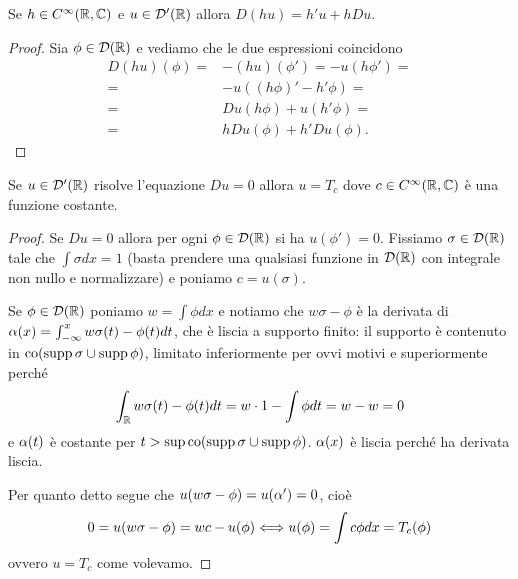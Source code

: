 \documentclass[a4paper]{article}
\DeclareMathOperator{\co}{co}
\begin{document}

\begin{lemma}\label{LmLeibnitzDistribuzioni}
Se $h\in C^{\infty}(\mathbb{R},\mathbb{C})$ e $u\in \mathcal{D}'(\mathbb{R})$ allora $D(hu)=h'u+hDu$.
\end{lemma}
\begin{proof}
Sia $\phi\in \mathcal{D}(\mathbb{R})$ e vediamo che le due espressioni coincidono
\begin{align*}
D(hu)(\phi)=&-(hu)(\phi')=-u(h\phi')=\\
=&-u((h\phi)'-h'\phi)=\\
=&Du(h\phi)+u(h'\phi)=\\
=&hDu(\phi)+h'Du(\phi).
\end{align*}
\end{proof}

\begin{lemma}\label{LmDerivataNullaImplicaDistribuzioneCostante}
Se $u\in \mathcal{D}'(\mathbb{R})$ risolve l'equazione $Du=0$ allora $u=T_c$ dove $c\in C^\infty(\mathbb{R},\mathbb{C})$ \`e una funzione costante.
\end{lemma}
\begin{proof}
Se $Du=0$ allora per ogni $\phi\in \mathcal{D}(\mathbb{R})$ si ha $u(\phi')=0$. Fissiamo $\sigma\in \mathcal{D}(\mathbb{R})$ tale che $\int \sigma dx=1$ (basta prendere una qualsiasi funzione in $\mathcal{D}(\mathbb{R})$ con integrale non nullo e normalizzare) e poniamo $c=u(\sigma)$. 

Se $\phi\in \mathcal{D}(\mathbb{R})$ poniamo $w=\int \phi dx$ e notiamo che $w\sigma-\phi$ \`e la derivata di $\alpha(x)=\int_{-\infty}^x w\sigma(t)-\phi(t)dt$, che \`e liscia a supporto finito:
il supporto \`e contenuto in $\co(\supp \sigma\cup \supp \phi)$, limitato inferiormente per ovvi motivi e superiormente perch\'e 
\[\int_{\mathbb{R}} w\sigma(t)-\phi(t)dt=w\cdot 1-\int \phi dt=w-w=0\] 
e $\alpha(t)$ \`e costante per $t>\sup \co(\supp \sigma\cup \supp \phi)$. $\alpha(x)$ \`e liscia perch\'e ha derivata liscia.

Per quanto detto segue che $u(w\sigma-\phi)=u(\alpha')=0$, cio\`e
\[0=u(w\sigma-\phi)=wc-u(\phi)\Longleftrightarrow u(\phi)=\int c\phi dx=T_c(\phi)\]
ovvero $u=T_c$ come volevamo.
\end{proof}
\end{document}
